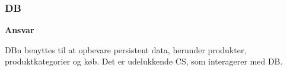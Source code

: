\subsubsection{\gls{DB}}

\textbf{Ansvar}

\gls{DB}n benyttes til at opbevare persistent data, herunder produkter, produktkategorier og køb. Det er udelukkende \gls{CS}, som interagerer med \gls{DB}.